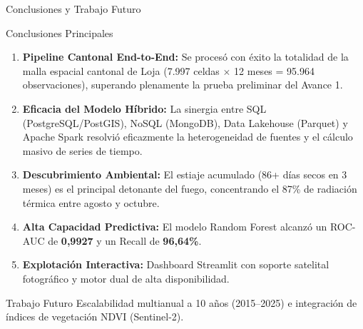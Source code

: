 \documentclass[aspectratio=169,11pt]{beamer}
\newcommand{\seccionactual}{Sustentaci\'on Final}
\begin{document}
\renewcommand{\seccionactual}{Conclusiones}
\begin{frame}{Conclusiones y Trabajo Futuro}
  \begin{alertblock}{Conclusiones Principales}
    \begin{enumerate}\small
      \item \textbf{Pipeline Cantonal End-to-End:} Se proces\'o con \'exito la totalidad de la malla espacial cantonal de Loja (7.997 celdas $\times$ 12 meses = 95.964 observaciones), superando plenamente la prueba preliminar del Avance 1.
      \item \textbf{Eficacia del Modelo H\'ibrido:} La sinergia entre SQL (PostgreSQL/PostGIS), NoSQL (MongoDB), Data Lakehouse (Parquet) y Apache Spark resolvi\'o eficazmente la heterogeneidad de fuentes y el c\'alculo masivo de series de tiempo.
      \item \textbf{Descubrimiento Ambiental:} El estiaje acumulado (86+ d\'ias secos en 3 meses) es el principal detonante del fuego, concentrando el 87\% de radiaci\'on t\'ermica entre agosto y octubre.
      \item \textbf{Alta Capacidad Predictiva:} El modelo Random Forest alcanz\'o un ROC-AUC de \textbf{0,9927} y un Recall de \textbf{96,64\%}.
      \item \textbf{Explotaci\'on Interactiva:} Dashboard Streamlit con soporte satelital fotogr\'afico y motor dual de alta disponibilidad.
    \end{enumerate}
  \end{alertblock}
  \vspace{0.2cm}
  \begin{block}{Trabajo Futuro}\scriptsize
    Escalabilidad multianual a 10 a\~nos (2015--2025) e integraci\'on de \'indices de vegetaci\'on NDVI (Sentinel-2).
  \end{block}
\end{frame}
\end{document}
